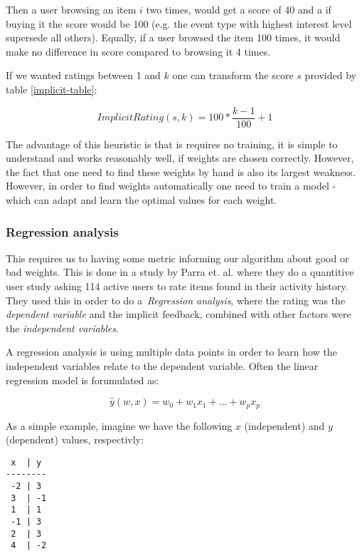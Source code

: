 Then a user browsing an item $i$ two times, would get a score of 40 and a if
buying it the score would be 100 (e.g. the event type with highest interest
level supersede all others). Equally, if a user browsed the item 100 times, it
would make no difference in score compared to browsing it 4 times.

If we wanted ratings between 1 and $k$ one can transform the score $s$ provided
by table \ref{implicit-table}:

\begin{equation}
  ImplicitRating(s, k) = 100 * \frac{k-1}{100} + 1 
\end{equation}

The advantage of this heuristic is that is requires no training, it is simple
to understand and works reasonably well, if weights are chosen correctly.
However, the fact that one need to find these weights by hand is also its
largest weakness. However, in order to find weights automatically one need to
train a model - which can adapt and learn the optimal values for each weight.

\subsubsection{Regression analysis}

This requires us to having some metric informing our algorithm about good or
bad weights. This is done in a study by Parra et. al. \cite{parra2011walk}
where they do a quantitive user study asking 114 active users to rate items
found in their activity history. They used this in order to do
a \textit{Regression analysis}, where the rating was the \textit{dependent
variable} and the implicit feedback, combined with other factors were the
\textit{independent variables}.

A regression analysis is using multiple data points in order to learn how the
independent variables relate to the dependent variable. Often the linear
regression model is forumulated as:

\begin{equation}
  \label{eq-regression}
  \hat{y}(w,x) = w_0 + w_1 x_1 + \dots + w_p x_p
\end{equation}

As a simple example, imagine we have the following $x$ (independent) and $y$
(dependent) values, respectivly:

\begin{verbatim}
 x  | y  
--------
 -2 | 3
 3  | -1
 1  | 1
 -1 | 3
 2  | 3
 4  | -2
\end{verbatim}

